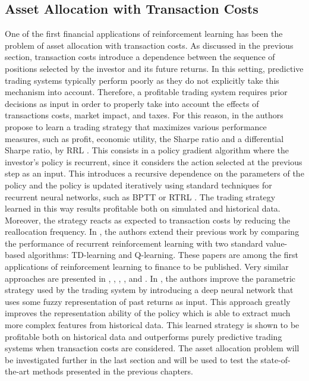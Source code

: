 \subsection{Asset Allocation with Transaction Costs}
One of the first financial applications of reinforcement learning has been the problem of asset allocation with transaction costs. As discussed in the previous section, transaction costs introduce a dependence between the sequence of positions selected by the investor and its future returns. In this setting, predictive trading systems typically perform poorly as they do not explicitly take this mechanism into account. Therefore, a profitable trading system requires prior decisions as input in order to properly take into account the effects of transactions costs, market impact, and taxes. For this reason, in \cite{moody1997optimization} the authors propose to learn a trading strategy that maximizes various performance measures, such as profit, economic utility, the Sharpe ratio and a differential Sharpe ratio, by \gls{RRL} \cite{jaeger2002tutorial}. This consists in a policy gradient algorithm where the investor's policy is recurrent, since it considers the action selected at the previous step as an input. This introduces a recursive dependence on the parameters of the policy and the policy is updated iteratively using standard techniques for recurrent neural networks, such as \gls{BPTT} \cite{werbos1990backpropagation} or \gls{RTRL} \cite{williams1989learning}. The trading strategy learned in this way results profitable both on simulated and historical data. Moreover, the strategy reacts as expected to transaction costs by reducing the reallocation frequency. In \cite{moody2001learning}, the authors extend their previous work by comparing the performance of recurrent reinforcement learning with two standard value-based algorithms: TD-learning and Q-learning. These papers are among the first applications of reinforcement learning to finance to be published. Very similar approaches are presented in \cite{choey1997nonlineareltit}, \cite{chapados2001cost}, \cite{gold2003FX}, \cite{casqueiro2006neuro}, \cite{dempster2006automated} and \cite{li2007short}. In \cite{deng2016deep}, the authors improve the parametric strategy used by the trading system by introducing a deep neural network that uses some fuzzy representation of past returns as input. This approach greatly improves the representation ability of the policy which is able to extract much more complex features from historical data. This learned strategy is shown to be profitable both on historical data and outperforms purely predictive trading systems when transaction costs are considered. The asset allocation problem will be investigated further in the last section and will be used to test the state-of-the-art methods presented in the previous chapters. 

